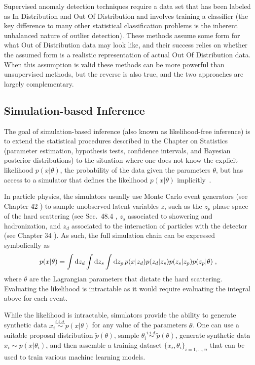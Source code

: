 Supervised anomaly detection techniques require a data set that has been labeled as In Distribution and Out Of Distribution and involves training a classifier (the key difference to many other statistical classification problems is the inherent unbalanced nature of outlier detection). These methods 
assume some form for what Out of Distribution data may look like, and their success relies
on whether the assumed form is a realistic
representation of actual Out Of Distribution data. When this assumption is 
valid these methods
can be more powerful than unsupervised
methods, but the reverse is also true, 
and the two approaches are largely 
complementary. 



\subsection{Simulation-based Inference}\label{ML:sec:SBI}

The goal of simulation-based inference (also known as likelihood-free inference) is to extend the statistical procedures described in the Chapter on Statistics (\eg parameter estimation, hypothesis tests, confidence intervals, and Bayesian posterior distributions) to the situation where one does not know the explicit likelihood $p(x|\theta)$, the probability of the data given the parameters $\theta$, but has access to a simulator that defines the likelihood $p(x|\theta)$ implicitly~\cite{Cranmer:2019eaq,Brehmer:2020cvb}. 

In particle physics, the simulators usually use Monte Carlo event generators (see Chapter 42  ) to sample unobserved latent variables $z$, such as the $z_p$ phase space of the hard scattering (see Sec.~48.4 , $z_s$ associated to showering and hadronization, and $z_d$ associated to the interaction of particles with the detector
(see Chapter 34 ). As such, the full simulation chain can be expressed symbolically as
\begin{equation}
    \label{ML:eq:simulation_chain}
    p(x|\theta) = \int \mathop{}\!\mathrm{d} z_d \int \mathop{}\!\mathrm{d} z_s \int \mathop{}\!\mathrm{d} z_p \, p(x | z_d) p(z_d | z_s) p(z_s | z_p) p(z_p | \theta) \;, 
\end{equation}
where $\theta$ are the Lagrangian parameters that dictate the hard scattering. Evaluating the likelihood is intractable as it would require evaluating the integral above for each event.  

While the likelihood is intractable, simulators provide the ability to generate synthetic data $x_i \overset{i.i.d.}{\sim} p(x|\theta)$ for any value of the parameters $\theta$. One can use a suitable proposal distribution $\tilde{p}(\theta)$, sample $\theta_i \overset{i.i.d.}{\sim} \tilde{p}(\theta)$, generate synthetic data $x_i \sim p(x|\theta_i)$, and then assemble a training dataset $\{x_i, \theta_i\}_{i=1,\dots,n}$ that can be used to train various machine learning models. 

